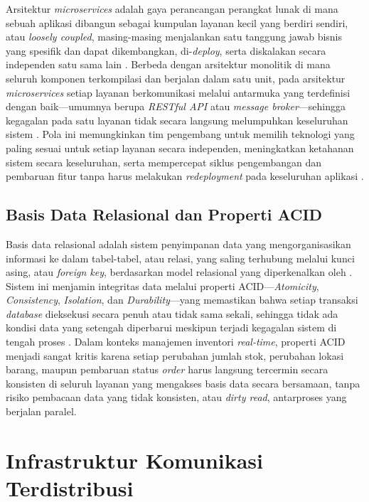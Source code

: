 Arsitektur \textit{microservices} adalah gaya perancangan perangkat lunak di mana sebuah aplikasi dibangun sebagai kumpulan layanan kecil yang berdiri sendiri, atau \textit{loosely coupled}, masing-masing menjalankan satu tanggung jawab bisnis yang spesifik dan dapat dikembangkan, di-\textit{deploy}, serta diskalakan secara independen satu sama lain \autocite{newman2015}. Berbeda dengan arsitektur monolitik di mana seluruh komponen terkompilasi dan berjalan dalam satu unit, pada arsitektur \textit{microservices} setiap layanan berkomunikasi melalui antarmuka yang terdefinisi dengan baik---umumnya berupa \textit{RESTful API} atau \textit{message broker}---sehingga kegagalan pada satu layanan tidak secara langsung melumpuhkan keseluruhan sistem \autocite{newman2015}. Pola ini memungkinkan tim pengembang untuk memilih teknologi yang paling sesuai untuk setiap layanan secara independen, meningkatkan ketahanan sistem secara keseluruhan, serta mempercepat siklus pengembangan dan pembaruan fitur tanpa harus melakukan \textit{redeployment} pada keseluruhan aplikasi \autocite{richardson2018}.

\subsection{Basis Data Relasional dan Properti ACID}

Basis data relasional adalah sistem penyimpanan data yang mengorganisasikan informasi ke dalam tabel-tabel, atau relasi, yang saling terhubung melalui kunci asing, atau \textit{foreign key}, berdasarkan model relasional yang diperkenalkan oleh \textcite{codd1970}. Sistem ini menjamin integritas data melalui properti ACID---\textit{Atomicity}, \textit{Consistency}, \textit{Isolation}, dan \textit{Durability}---yang memastikan bahwa setiap transaksi \textit{database} dieksekusi secara penuh atau tidak sama sekali, sehingga tidak ada kondisi data yang setengah diperbarui meskipun terjadi kegagalan sistem di tengah proses \autocite{ramakrishnan2003}. Dalam konteks manajemen inventori \textit{real-time}, properti ACID menjadi sangat kritis karena setiap perubahan jumlah stok, perubahan lokasi barang, maupun pembaruan status \textit{order} harus langsung tercermin secara konsisten di seluruh layanan yang mengakses basis data secara bersamaan, tanpa risiko pembacaan data yang tidak konsisten, atau \textit{dirty read}, antarproses yang berjalan paralel.

\section{Infrastruktur Komunikasi Terdistribusi}
\label{sec:infra-komunikasi}

